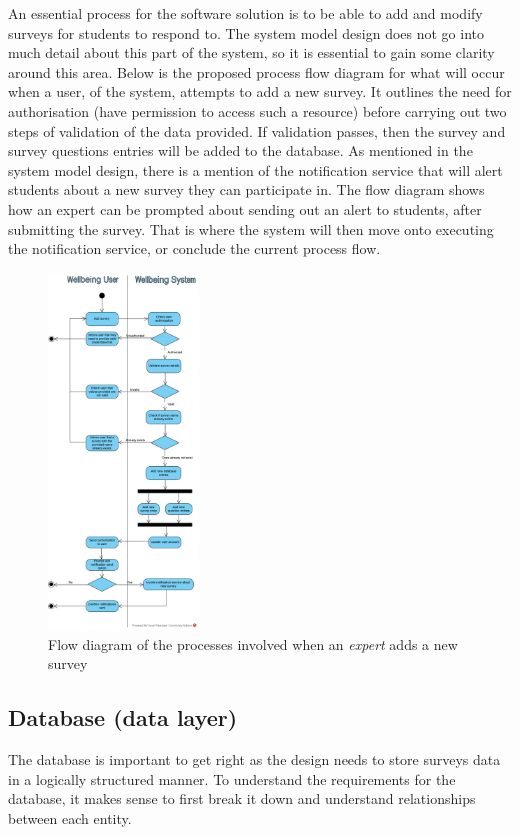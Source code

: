 An essential process for the software solution is to be able to add and modify surveys for students to respond to.
The system model design does not go into much detail about this part of the system, so it is essential to gain some clarity around this area.
Below is the proposed process flow diagram for what will occur when a user, of the system, attempts to add a new survey.
It outlines the need for authorisation (have permission to access such a resource) before carrying out two steps of validation of the
data provided.
If validation passes, then the survey and survey questions entries will be added to the database.
As mentioned in the system model design, there is a mention of the notification service that will alert students about a new survey they
can participate in.
The flow diagram shows how an expert can be prompted about sending out an alert to students, after submitting the survey.
That is where the system will then move onto executing the notification service, or conclude the current process flow.

\begin{figure}[ht]
    \centering
    \includegraphics[width=150px]{images/flow_diagram.png}
    \caption{Flow diagram of the processes involved when an \textit{expert} adds a new survey}
\end{figure}

\clearpage

\subsection{Database (data layer)}
The database is important to get right as the design needs to store surveys data in a logically structured manner.
To understand the requirements for the database, it makes sense to first break it down and understand relationships between
each entity.

